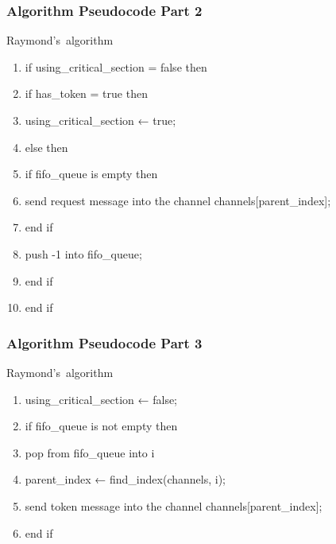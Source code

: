 \documentclass[11pt]{beamer}              %
\begin{document}
\begin{frame}
\frametitle{Algorithm Pseudocode Part 2}

\begin{center}
\begin{algorithm}[H]
	\scriptsize
	\def\algorithmlabel{Raymond's}
    \caption{\algorithmlabel\ algorithm}
    \label{alg:raymondsalgorithm}
    \begin{algorithmic}[1]
            \begin{enumerate}
                \item if using\_critical\_section = false then
                \item \quad if has\_token = true then
                \item \quad\quad using\_critical\_section ← true;
                \item \quad else then
                \item \quad\quad if fifo\_queue is empty then
                \item \quad\quad\quad send request message into the channel channels[parent\_index];
                \item \quad\quad end if
                \item \quad\quad push -1 into fifo\_queue;
                \item \quad end if
                \item end if
            \end{enumerate}
    \end{algorithmic}
\end{algorithm}
\end{center}
\end{frame}

\begin{frame}
\frametitle{Algorithm Pseudocode Part 3}

\begin{center}
\begin{algorithm}[H]
	\scriptsize
	\def\algorithmlabel{Raymond's}
    \caption{\algorithmlabel\ algorithm}
    \label{alg:raymondsalgorithm}
    \begin{algorithmic}[1]
            \begin{enumerate}
                \item using\_critical\_section ← false;
                \item if fifo\_queue is not empty then
                \item \quad pop from fifo\_queue into i
                \item \quad parent\_index ← find\_index(channels, i);
                \item \quad send token message into the channel channels[parent\_index];
                \item end if
            \end{enumerate}
    \end{algorithmic}
\end{algorithm}
\end{center}
\end{frame}
\end{document}
